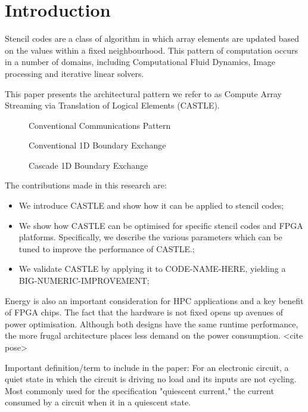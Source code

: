 \section{Introduction}
Stencil codes are a class of algorithm in which array elements are updated based on the values within a fixed neighbourhood.
This pattern of computation occurs in a number of domains, including Computational Fluid Dynamics, Image processing and iterative linear solvers.

This paper presents the architectural pattern we refer to as Compute Array Streaming via Translation of Logical Elements (CASTLE).

\begin{figure}
  \centering
  
  \caption{Conventional Communications Pattern}
  \label{fig:convcomms}
\end{figure}

\begin{figure}
  \centering
  
  \caption{Conventional 1D Boundary Exchange}
  \label{fig:exch1dold}
\end{figure}


\begin{figure}
  \centering
  
  \caption{Cascade 1D Boundary Exchange}
  \label{fig:trans1d}
\end{figure}


The contributions made in this research are:
\begin{itemize}
  \item{We introduce CASTLE and show how it can be applied to stencil codes;}
  \item{We show how CASTLE can be optimised for specific stencil codes and FPGA platforms.
        Specifically, we describe the various parameters which can be tuned to improve the performance of CASTLE.;}
  \item{We validate CASTLE by applying it to CODE-NAME-HERE, yielding a BIG-NUMERIC-IMPROVEMENT;}
\end{itemize}

Energy is also an important consideration for HPC applications and a key benefit of FPGA chips.
The fact that the hardware is not fixed opens up avenues of power optimisation.
Although both designs have the same runtime performance, the more frugal architecture places less demand on the power consumption.
<cite pose>

Important definition/term to include in the paper:
For an electronic circuit, a quiet state in which the circuit is driving no load and its inputs are not cycling. Most commonly used for the specification "quiescent current," the current consumed by a circuit when it in a quiescent state.

